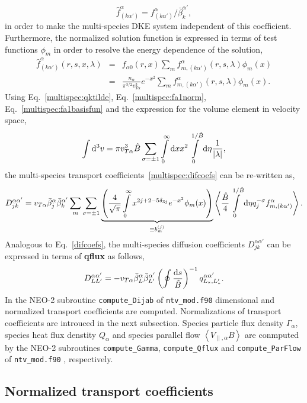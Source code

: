 \documentclass[preprint,prb,aps]{revtex4-1}
\newcommand{\be}[1]{\begin{equation} \label{#1}}
\newcommand{\ee}{\end{equation}}
\newcommand{\bea}[1]{\begin{eqnarray} \label{#1}}
\newcommand{\eea}{\end{eqnarray}}
\newcommand{\non}{\nonumber\\}
\newcommand{\rd}{{\rm d}}
\begin{document}
\be{multispec:fa1norm}
\hat{f}_{(k \alpha')}^{\alpha} = f_{(k \alpha')}^{\alpha} / \bar{\beta}_k^{\alpha'},
\ee
in order to make the multi-species DKE system independent of this coefficient.
Furthermore, the normalized solution function is expressed in terms of test functions
$\phi_m$ in order to resolve the energy dependence of the solution,
\bea{multispec:fa1basisfun}
\hat{f}_{(k \alpha')}^{\alpha}(r,s,x,\lambda)
&=&
f_{\alpha 0}(r,x) \sum\limits_{m} f_{m,(k \alpha')}^{\alpha}(r,s,\lambda) \phi_m(x) \non
&=& \frac{n_\alpha}{\pi^{3/2} v_{T \alpha}^3} e^{-x^2}
\sum\limits_{m} f_{m,(k \alpha')}^{\alpha}(r,s,\lambda) \phi_m(x).
\eea
Using Eq.~\eqref{multispec:qktilde}, Eq.~\eqref{multispec:fa1norm}, Eq.~\eqref{multispec:fa1basisfun}
and the expression for the volume element in velocity space,
\be{multispec:volumeelement}
\int {\rd}^3v = \pi v_{T\alpha}^3 \hat{B} \sum\limits_{\sigma=\pm 1}
\int\limits_0^\infty {\rd}x x^2 \int\limits_0^{1/\hat{B}} {\rd}\eta \frac{1}{|\lambda|},
\ee
the multi-species transport coefficients~\eqref{multispec:difcoefs} can be re-written as,
\be{multispec:difcoefs_full}
D_{jk}^{\alpha \alpha'} = v_{T \alpha} \bar{\beta}_j^{\alpha} \bar{\beta}_k^{\alpha'}
\sum\limits_m \sum\limits_{\sigma=\pm 1}
\underbrace{\left( \frac{4}{\sqrt{\pi}} \int\limits_0^\infty x^{2j+2-5\delta_{3j}} e^{-x^2} \phi_m(x) \right)}_{\equiv b_m^{(j)}}
\left\langle \frac{\hat{B}}{4} \int\limits_0^{1/\hat{B}} {\rd}\eta q_j^{-\sigma} f_{m,(k \alpha')}^{\alpha} \right\rangle.
\ee
Analogous to Eq.~\eqref{difcoefs}, the multi-species diffusion coefficients $D_{jk}^{\alpha \alpha'}$
can be expressed in terms of {\bf qflux} as follows,
\be{multispec:difcoefs_final}
D_{LL^\prime}^{\alpha \alpha'} =
-v_{T\alpha} \bar\beta_{L}^{\alpha} \bar\beta_{L^\prime}^{\alpha'}
\left(\oint \frac{\rd s}{\hat B}\right)^{-1}
q_{L_\ast,L_\ast^\prime}^{\alpha \alpha'}.
\ee
In the NEO-2 subroutine \verb|compute_Dijab| of \verb|ntv_mod.f90|
dimensional and normalized transport coefficients are computed.
Normalizations of transport coefficients are introuced in the next subsection.
Species particle flux density $\Gamma_\alpha$, species heat flux denstity $Q_\alpha$ and
species parallel flow $\left\langle V_{\parallel,\alpha} B \right\rangle$ are
conmputed by the NEO-2 subroutines \verb|compute_Gamma|, \verb|compute_Qflux| and
\verb|compute_ParFlow| of \verb|ntv_mod.f90| , respectively.

\subsection{Normalized transport coefficients}
\end{document}
